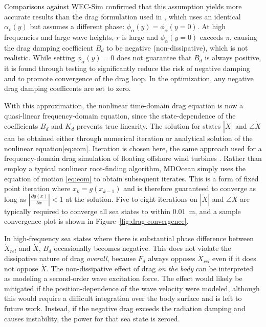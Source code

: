 Comparisons against WEC-Sim confirmed that this assumption yields more accurate results than the drag formulation used in \cite{quartier_influence_2021}, which uses an identical $\alpha_v(y)$ but assumes a different phase: $\phi_\alpha(y)=\phi_\alpha(y=0)$. 
At high frequencies and large wave heights, $r$ is large and $\phi_\alpha(y=0)$ exceeds $\pi$, causing the drag damping coefficient $B_d$ to be negative (non-dissipative), which is not realistic.
While setting $\phi_\alpha(y)=0$ does not guarantee that $B_d$ is always positive, it is found through testing to significantly reduce the risk of negative damping and to promote convergence of the drag loop.
In the optimization, any negative drag damping coefficents are set to zero.


With this approximation, the nonlinear time-domain drag equation is now a quasi-linear frequency-domain equation, since the state-dependence of the coefficients $B_{d}$ and $K_{d}$ prevents true linearity.
The solution for states $|\dot{X}|$ and $\angle \dot{X}$ can be obtained either through numerical iteration or analytical solution of the nonlinear equation\eqref{eq:eom}.
Iteration is chosen here, the same approach used for a frequency-domain drag simulation of floating offshore wind turbines \cite{hall_open-source_2022}.
Rather than employ a typical nonlinear root-finding algorithm, MDOcean simply uses the equation of motion \eqref{eq:eom} to obtain subsequent iterates.
This is a form of fixed point iteration where $x_k = g(x_{k-1})$ and is therefore guaranteed to converge as long as $|\frac{\partial g(x)}{\partial x}| < 1$ at the solution. %
Five to eight iterations on $|\dot{X}|$ and $\angle \dot{X}$ are typically required to converge all sea states to within 0.01~m, %
and a sample convergence plot is shown in Figure~\ref{fig:drag-convergence}.

In high-frequency sea states where there is substantial phase difference between $\dot{X}_{rel}$ and $\dot{X}$, $B_d$ occasionally becomes negative.
This does not violate the dissipative nature of drag \textit{overall}, because $F_d$ always opposes $\dot{X}_{rel}$ even if it does not oppose $\dot{X}$.
The non-dissipative effect of drag \textit{on the body} can be interpreted as modeling a second-order wave excitation force.
The effect would likely be mitigated if the position-dependence of the wave velocity were modeled, although this would require a difficult integration over the body surface and is left to future work.
Instead, if the negative drag exceeds the radiation damping and causes instability, the power for that sea state is zeroed.

